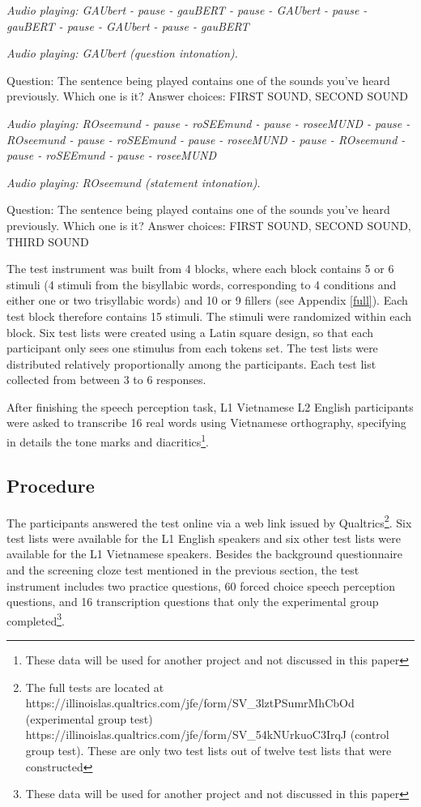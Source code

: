 \documentclass[a4paper]{article}
\begin{document}
\begin{description}
  \item \textit{Audio playing: GAUbert - pause - gauBERT - pause - GAUbert - pause - gauBERT  - pause - GAUbert - pause - gauBERT }
  \item \textit{Audio playing: GAUbert (question intonation).} 
  \item Question: The sentence being played contains one of the sounds you've heard previously. Which one is it? Answer choices: FIRST SOUND, SECOND SOUND
  \item \textit{Audio playing: ROseemund - pause - roSEEmund - pause - roseeMUND - pause - ROseemund - pause - roSEEmund - pause - roseeMUND - pause - ROseemund - pause - roSEEmund - pause - roseeMUND}
    \item \textit{Audio playing: ROseemund (statement intonation).} 
  \item Question: The sentence being played contains one of the sounds you've heard previously. Which one is it? Answer choices: FIRST SOUND, SECOND SOUND, THIRD SOUND

\end{description}

The test instrument was built from 4 blocks, where each block contains 5 or 6 stimuli (4 stimuli from the bisyllabic words, corresponding to 4 conditions and either one or two trisyllabic words) and 10 or 9 fillers (see Appendix \ref{full}). Each test block therefore contains 15 stimuli. The stimuli were randomized within each block. Six test lists were created using a Latin square design, so that each participant only sees one stimulus from each tokens set. The test lists were distributed relatively proportionally among the participants. Each test list collected from between 3 to 6 responses.

After finishing the speech perception task, L1 Vietnamese L2 English participants were asked to transcribe 16 real words using Vietnamese orthography, specifying in details the tone marks and diacritics\footnote{These data will be used for another project and not discussed in this paper}.

\subsection{Procedure}

The participants answered the test online via a web link issued by Qualtrics\footnote{The full tests are located at https://illinoislas.qualtrics.com/jfe/form/SV_3lztPSumrMhCbOd (experimental group test) https://illinoislas.qualtrics.com/jfe/form/SV_54kNUrkuoC3IrqJ (control group test). These are only two test lists out of twelve test lists that were constructed}. Six test lists were available for the L1 English speakers and six other test lists were available for the L1 Vietnamese speakers. Besides the background questionnaire and the screening cloze test mentioned in the previous section, the test instrument includes two practice questions, 60 forced choice speech perception questions, and 16 transcription questions that only the experimental group completed\footnote{These data will be used for another project and not discussed in this paper}.
\end{document}
